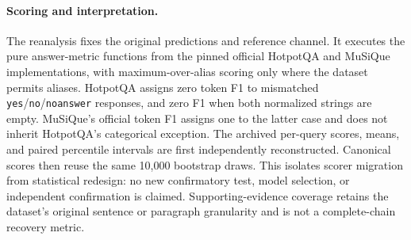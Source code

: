 \paragraph{Scoring and interpretation.}
The reanalysis fixes the original predictions and reference channel. It
executes the pure answer-metric functions from the pinned official HotpotQA
and MuSiQue implementations, with maximum-over-alias scoring only where
the dataset permits aliases. HotpotQA assigns zero token F1 to mismatched
\texttt{yes}/\texttt{no}/\texttt{noanswer} responses, and zero F1 when both
normalized strings are empty. MuSiQue's official token F1 assigns one to
the latter case and does not inherit HotpotQA's categorical exception.
The archived per-query scores, means, and paired percentile intervals are
first independently reconstructed. Canonical scores then reuse the same
10,000 bootstrap draws. This isolates scorer migration from statistical
redesign: no new confirmatory test, model selection, or independent
confirmation is claimed. Supporting-evidence coverage retains the
dataset's original sentence or paragraph granularity and is not a
complete-chain recovery metric.
